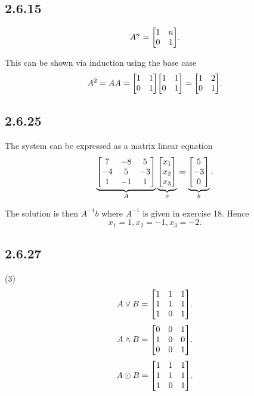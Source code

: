 \documentclass[12pt,titlepage]{extarticle}
\begin{document}
\subsection*{2.6.15}
\[
    A^n = \mqty[
    1 & n \\
    0 & 1 \\
    ]
.\]

This can be shown via induction using the base case
\[
    A^2  = AA = \mqty[
    1 & 1 \\
    0 & 1 \\
    ] \mqty[
    1 & 1 \\
    0 & 1 \\
    ] = \mqty[
    1 & 2 \\
    0 & 1 \\
    ]
.\]

\subsection*{2.6.25}
The system can be expressed as a matrix linear equation
\[
    \underbrace{\mqty[
    7 & -8 & 5 \\
    -4 & 5 & -3 \\
    1 & -1 & 1
    ]}_A 
    \underbrace{\mqty[
    x_1 \\
    x_2 \\
    x_3
    ]}_x =
    \underbrace{\mqty[
    5 \\
    -3 \\
    0
    ]}_b
.\]

The solution is then $A^{-1} b$ where $A^{-1}$ is given in exercise 18. Hence
\[
    x_1 = 1, x_2 = -1, x_3 = -2
.\]

\subsection*{2.6.27}
\begin{tasks}(3)
    \task
    \[
        A \lor B = \mqty[
        1 & 1 & 1 \\
        1 & 1 & 1 \\
        1 & 0 & 1 \\
        ]
    .\]
    \task
    \[
        A \land B = \mqty[
        0 & 0 & 1 \\
        1 & 0 & 0 \\
        0 & 0 & 1 \\
        ]
    .\]
    \task
    \[
        A \odot B = \mqty[
        1 & 1 & 1 \\
        1 & 1 & 1 \\
        1 & 0 & 1 \\
        ]
    .\]
\end{tasks}
\end{document}
